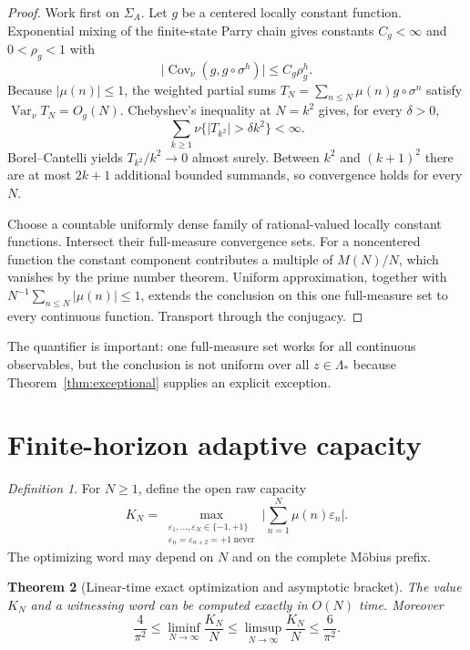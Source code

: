 \documentclass[11pt,a4paper]{article}
\newtheorem{theorem}{Theorem}[section]
\theoremstyle{remark}
\newtheorem{definition}[theorem]{Definition}
\newcommand{\Mob}{\mu}
\newcommand{\Lam}{\Lambda_*}
\newcommand{\eps}{\varepsilon}
\newcommand{\Var}{\operatorname{Var}}
\newcommand{\Cov}{\operatorname{Cov}}
\newcommand{\abs}[1]{\lvert#1\rvert}
\begin{document}
\begin{proof}
Work first on $\Sigma_A$.  Let $g$ be a centered locally constant function.
Exponential mixing of the finite-state Parry chain gives constants
$C_g<\infty$ and $0<\rho_g<1$ with
\[
 \abs{\Cov_\nu(g,g\circ\sigma^h)}\leq C_g\rho_g^h.
\]
Because $\abs{\Mob(n)}\leq1$, the weighted partial sums
$T_N=\sum_{n\leq N}\Mob(n)g\circ\sigma^n$ satisfy
$\Var_\nu T_N=O_g(N)$.  Chebyshev's inequality at $N=k^2$ gives, for every
$\delta>0$,
\[
 \sum_{k\geq1}
 \nu\{\abs{T_{k^2}}>\delta k^2\}<\infty.
\]
Borel--Cantelli yields $T_{k^2}/k^2\to0$ almost surely.  Between $k^2$ and
$(k+1)^2$ there are at most $2k+1$ additional bounded summands, so convergence
holds for every $N$.

Choose a countable uniformly dense family of rational-valued locally
constant functions.  Intersect their full-measure convergence sets.  For a
noncentered function the constant component contributes a multiple of
$M(N)/N$, which vanishes by the prime number theorem.  Uniform approximation,
together with $N^{-1}\sum_{n\leq N}\abs{\Mob(n)}\leq1$, extends the conclusion
on this one full-measure set to every continuous function.  Transport through
the conjugacy.
\end{proof}

The quantifier is important: one full-measure set works for all continuous
observables, but the conclusion is not uniform over all $z\in\Lam$ because
Theorem~\ref{thm:exceptional} supplies an explicit exception.

\section{Finite-horizon adaptive capacity}

\begin{definition}
For $N\geq1$, define the open raw capacity
\begin{equation}
 K_N=\max_{\substack{\eps_1,\ldots,\eps_N\in\{-1,+1\}\\
              \eps_n=\eps_{n+2}=+1\ \mathrm{never}}}
 \abs{\sum_{n=1}^{N}\Mob(n)\eps_n}.
 \label{eq:capacity}
\end{equation}
The optimizing word may depend on $N$ and on the complete M\"obius prefix.
\end{definition}

\begin{theorem}[Linear-time exact optimization and asymptotic bracket]
\label{thm:capacity}
The value $K_N$ and a witnessing word can be computed exactly in $O(N)$ time.
Moreover
\begin{equation}
 \frac4{\pi^2}
 \leq\liminf_{N\to\infty}\frac{K_N}{N}
 \leq\limsup_{N\to\infty}\frac{K_N}{N}
 \leq\frac6{\pi^2}.
 \label{eq:capacity-bracket}
\end{equation}
\end{theorem}
\end{document}
